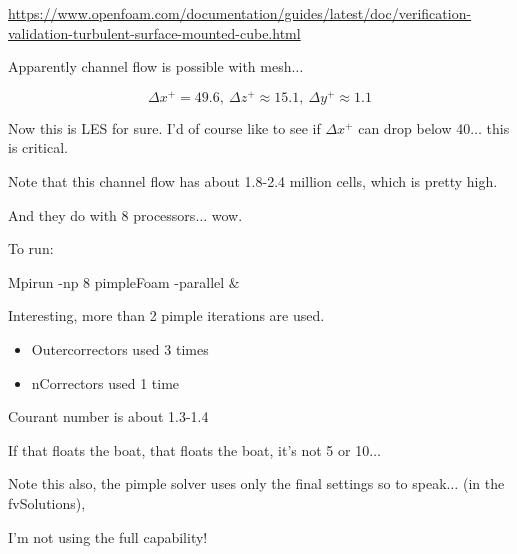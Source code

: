 \documentclass[12pt]{article}
\renewcommand{\_}{\kern-1.5pt\textunderscore\kern-1.5pt}
\begin{document}
\href{https://www.openfoam.com/documentation/guides/latest/doc/verification-validation-turbulent-surface-mounted-cube.html}{https://www.openfoam.com/documentation/guides/latest/doc/verification-validation-turbulent-surface-mounted-cube.html}\par

Apparently channel flow is possible with mesh$ \ldots $ \par

 \[  \Delta x^{+}=49.6,~  \Delta z^{+} \approx 15.1,~  \Delta y^{+} \approx 1.1 \] \par

Now this is LES for sure. I’d of course like to see if  \(  \Delta x^{+} \)  can drop below 40$ \ldots $  this is critical.\par

 \par

Note that this channel flow has about 1.8-2.4 million cells, which is pretty high.\par

And they do with 8 processors$ \ldots $  wow.\par

To run:\par

Mpirun -np 8 pimpleFoam -parallel $\&$ \par


\vspace{\baselineskip}
Interesting, more than 2 pimple iterations are used.\par
\begin{itemize}
	\item Outercorrectors used 3 times\par

	\item nCorrectors used 1 time\par
\end{itemize}


Courant number is about 1.3-1.4\par

If that floats the boat, that floats the boat, it’s not 5 or 10$ \ldots $ \par


\vspace{\baselineskip}
Note this also, the pimple solver uses only the final settings so to speak$ \ldots $  (in the fvSolutions),\par

I’m not using the full capability!\par
\end{document}
